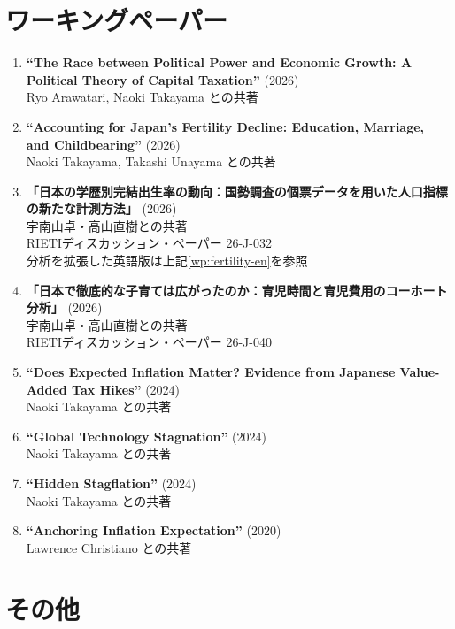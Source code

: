 \documentclass[11pt,a4paper]{article}
\newcommand{\entrytitle}[1]{{\bfseries\color{darknavy}#1}}
\newcommand{\workingpaper}[3]{
    \item \textbf{``#1''} (#2)\\
    {\small #3}
}
\begin{document}
\section{ワーキングペーパー}

\begin{enumerate}[leftmargin=*, labelsep=8pt, itemsep=6pt]

    \workingpaper{The Race between Political Power and Economic Growth: A Political Theory of Capital Taxation}{2026}
    {Ryo Arawatari, Naoki Takayama との共著}

    \workingpaper{Accounting for Japan's Fertility Decline: Education, Marriage, and Childbearing}{2026}
    {Naoki Takayama, Takashi Unayama との共著}\label{wp:fertility-en}

    \item \textbf{「日本の学歴別完結出生率の動向：国勢調査の個票データを用いた人口指標の新たな計測方法」} (2026)\\
    {\small 宇南山卓・高山直樹との共著}\\
    {\small RIETIディスカッション・ペーパー 26-J-032}\\
    {\small 分析を拡張した英語版は上記\ref{wp:fertility-en}を参照}

    \item \textbf{「日本で徹底的な子育ては広がったのか：育児時間と育児費用のコーホート分析」} (2026)\\
    {\small 宇南山卓・高山直樹との共著}\\
    {\small RIETIディスカッション・ペーパー 26-J-040}

    \workingpaper{Does Expected Inflation Matter? Evidence from Japanese Value-Added Tax Hikes}{2024}
    {Naoki Takayama との共著}

    \workingpaper{Global Technology Stagnation}{2024}
    {Naoki Takayama との共著}

    \workingpaper{Hidden Stagflation}{2024}
    {Naoki Takayama との共著}

    \workingpaper{Anchoring Inflation Expectation}{2020}
    {Lawrence Christiano との共著}

\end{enumerate}

\section{その他}

\noindent\entrytitle{学会・セミナー・講演}
\end{document}
